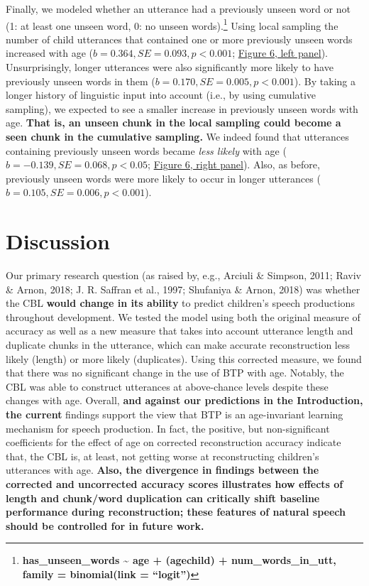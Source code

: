 \documentclass[man,mask,floatsintext]{apa6}
\let\rmarkdownfootnote\footnote%
\def\footnote{\protect\rmarkdownfootnote}
\begin{document}
Finally, we modeled whether an utterance had a previously unseen word or
not (1: at least one unseen word, 0: no unseen words).\footnote{\textbf{has\_unseen\_words
  \textasciitilde{} age + (age\textbar{}child) + num\_words\_in\_utt,
  family = binomial(link = \enquote{logit})}} Using local sampling the
number of child utterances that contained one or more previously unseen
words increased with age (\(b = 0.364, SE = 0.093, p < 0.001\);
\protect\hyperlink{fig6}{Figure 6, left panel}). Unsurprisingly, longer
utterances were also significantly more likely to have previously unseen
words in them (\(b = 0.170, SE = 0.005, p < 0.001\)). By taking a longer
history of linguistic input into account (i.e., by using cumulative
sampling), we expected to see a smaller increase in previously unseen
words with age. \textbf{That is, an unseen chunk in the local sampling
could become a seen chunk in the cumulative sampling.} We indeed found
that utterances containing previously unseen words became \emph{less
likely} with age (\(b = -0.139, SE = 0.068, p < 0.05\);
\protect\hyperlink{fig6}{Figure 6, right panel}). Also, as before,
previously unseen words were more likely to occur in longer utterances
(\(b = 0.105, SE = 0.006, p < 0.001\)).

\section{Discussion}\label{discussion}

Our primary research question (as raised by, e.g., Arciuli \& Simpson,
2011; Raviv \& Arnon, 2018; J. R. Saffran et al., 1997; Shufaniya \&
Arnon, 2018) was whether the CBL \textbf{would change in its ability} to
predict children's speech productions throughout development. We tested
the model using both the original measure of accuracy as well as a new
measure that takes into account utterance length and duplicate chunks in
the utterance, which can make accurate reconstruction less likely
(length) or more likely (duplicates). Using this corrected measure, we
found that there was no significant change in the use of BTP with age.
Notably, the CBL was able to construct utterances at above-chance levels
despite these changes with age. Overall, \textbf{and against our
predictions in the Introduction, the current} findings support the view
that BTP is an age-invariant learning mechanism for speech production.
In fact, the positive, but non-significant coefficients for the effect
of age on corrected reconstruction accuracy indicate that, the CBL is,
at least, not getting worse at reconstructing children's utterances with
age. \textbf{Also, the divergence in findings between the corrected and
uncorrected accuracy scores illustrates how effects of length and
chunk/word duplication can critically shift baseline performance during
reconstruction; these features of natural speech should be controlled
for in future work.}
\end{document}
